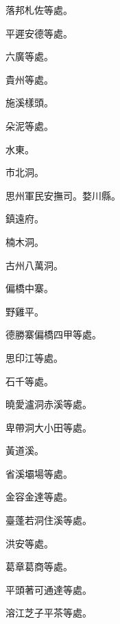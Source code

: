 \begin{pinyinscope}
 落邦札佐等處。



 平遲安德等處。



 六廣等處。



 貴州等處。



 施溪樣頭。



 朵泥等處。



 水東。



 市北洞。



 思州軍民安撫司。婺川縣。



 鎮遠府。



 楠木洞。



 古州八萬洞。



 偏橋中寨。



 野雞平。



 德勝寨偏橋四甲等處。



 思印江等處。



 石千等處。



 曉愛瀘洞赤溪等處。



 卑帶洞大小田等處。



 黃道溪。



 省溪壩場等處。



 金容金達等處。



 臺蓬若洞住溪等處。



 洪安等處。



 葛章葛商等處。



 平頭著可通達等處。



 溶江芝子平茶等處。




\end{pinyinscope}
